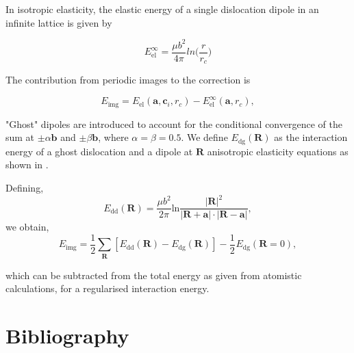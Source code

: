\documentclass[a4paper,11pt]{article}
\begin{document}
In isotropic elasticity, the elastic energy of a single dislocation dipole in an
infinite lattice is given by


\[ E_{\text{el}}^{\infty} = \frac{\mu b^2}{4\pi} ln \big( \frac{r}{r_{c}} \big)  \]

The contribution from periodic images to the correction is 

\[ E_{\text{img} } = E_{\text{el}} (\mathbf{a}, \mathbf{c}_i , r_c) - E_{\text{el}}^{\infty}
   (\mathbf{a}, r_c),\]

"Ghost" dipoles are introduced to account for the conditional convergence of the sum at \(\pm\alpha
   \mathbf{b}\) and \(\pm \beta\mathbf{b}\), where \(\alpha = \beta = 0.5\). We define \(E_{\text{dg}} (\mathbf{R})\) as the
interaction energy of a ghost dislocation and a dipole at \(\mathbf{R}\) anisotropic elasticity
equations as shown in \cite{Cai2003}.


Defining, 
 \[ E_{\text{dd}} (\mathbf{R}) = \frac{\mu b^2}{2\pi}
   \text{ln}\frac{|\mathbf{R}|^2}{|\mathbf{R}+\mathbf{a}|\cdot|\mathbf{R}-\mathbf{a}|},
   \]
we obtain,
\[ E_{\text{img}} = \frac{1}{2}\sum_{\mathbf{R}} [ E_{\text{dd}} (\mathbf{R}) - E_{\text{dg}} (\mathbf{R}) ] - \frac{1}{2}_{}
   E_{\text{dg}} (\mathbf{R} = 0),  \]

which can be subtracted from the total energy as given from atomistic calculations, for a
regularised interaction energy. 

\section{Bibliography}
\label{sec:orgad4e709}
\label{org4dfc7e4}




\end{document}
